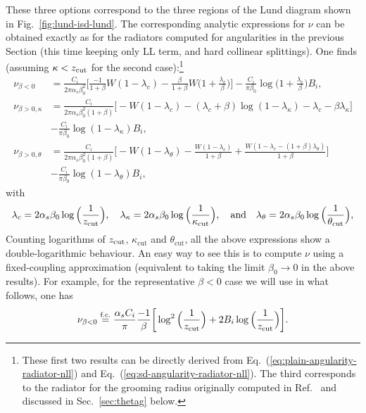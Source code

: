 These three options correspond to the three regions of the Lund
diagram shown in Fig.~\ref{fig:lund-isd-lund}.
%
The corresponding analytic expressions for $\nu$ can be obtained
exactly as for the radiators computed for angularities in the previous
Section (this time keeping only LL term, and hard collinear
splittings). One finds (assuming $\kappa<z_{\text{cut}}$ for the second
case):\footnote{These first two results can be directly derived
  from Eq.~(\ref{eq:plain-angularity-radiator-nll})
  and Eq.~(\ref{eq:sd-angularity-radiator-nll}). The third corresponds to
  the radiator for the \SD grooming radius originally computed in
  Ref.~\cite{Larkoski:2014wba} and discussed in Sec.~\ref{sec:thetag}
  below.}
\begin{align}
  \nu_{\beta<0} & 
   = \frac{C_i}{2\pi\alpha_s\beta_0^2}
    \bigg[\frac{-1}{1+\beta}W(1-\lambda_c)-\frac{\beta}{1+\beta}W\Big(1+\frac{\lambda_c}{\beta}\Big)\bigg]-\frac{C_i}{\pi\beta_0}
                   \log\Big(1+\frac{\lambda_c}{\beta}\Big)B_i,\label{eq:isd-nu-betaneg}\\
  \nu_{\beta>0,\kappa} & 
   = \frac{C_i}{2\pi\alpha_s\beta_0^2(1+\beta)}
                         \bigg[-W(1-\lambda_c)-(\lambda_c+\beta)\log(1-\lambda_\kappa)-\lambda_c-\beta\lambda_\kappa\bigg]\nonumber\\
  & -\frac{C_i}{\pi\beta_0} \log(1-\lambda_\kappa)B_i,\\
  \nu_{\beta>0,\theta} & 
   = \frac{C_i}{2\pi\alpha_s\beta_0^2(1+\beta)}
    \bigg[-W(1-\lambda_\theta)-\frac{W(1-\lambda_c)}{1+\beta}+\frac{W(1-\lambda_c-(1+\beta)\lambda_\theta)}{1+\beta}
     \bigg]\nonumber\\
  & -\frac{C_i}{\pi\beta_0} \log(1-\lambda_\theta)B_i,
\end{align}
with
\[
  \lambda_c = 2\alpha_s\beta_0\log\Big(\frac{1}{z_{\text{cut}}}\Big),\quad
  \lambda_\kappa = 2\alpha_s\beta_0\log\Big(\frac{1}{\kappa_\text{cut}}\Big),\quad\text{and}\quad
  \lambda_\theta =
  2\alpha_s\beta_0\log\Big(\frac{1}{\theta_\text{cut}}\Big),
\]
Counting logarithms of $z_{\text{cut}}$, $\kappa_\text{cut}$ and
$\theta_\text{cut}$, all the above expressions show a
double-logarithmic behaviour. An easy way to see this is to compute
$\nu$ using a fixed-coupling approximation (equivalent to taking the
limit $\beta_0\to 0$ in the above results). For example, for the
representative $\beta<0$ case we will use in what follows, one has
\begin{equation}
  \nu_{\beta<0} \overset{\text{f.c.}}{=}
   \frac{\alpha_sC_i}{\pi}\frac{-1}{\beta}\bigg[
   \log^2\Big(\frac{1}{z_{\text{cut}}}\Big)+2B_i\log\Big(\frac{1}{z_{\text{cut}}}\Big)\bigg].
\end{equation}


